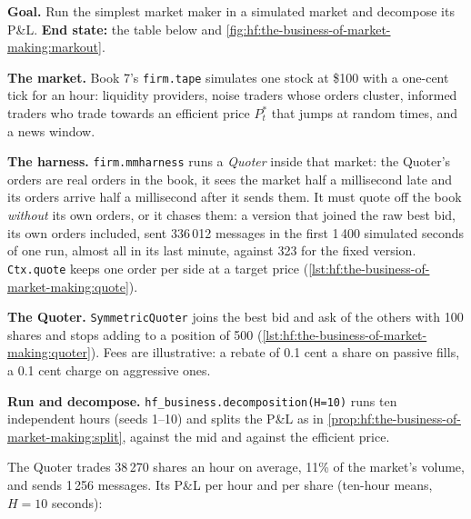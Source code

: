 \begin{tutorial}
\textbf{Goal.} Run the simplest market maker in a simulated market and decompose its P\&L. \textbf{End state:} the table below and
\cref{fig:hf:the-business-of-market-making:markout}.
\begin{tutsteps}
\item \textbf{The market.} Book 7's \texttt{firm.tape} simulates one stock at \$100 with a one-cent tick for an hour: liquidity providers, noise
traders whose orders cluster, informed traders who trade towards an efficient price $P^\ast_t$ that jumps at random times, and a news window.
\item \textbf{The harness.} \texttt{firm.mmharness} runs a \emph{Quoter} inside that market: the Quoter's orders are real orders in the book, it
sees the market half a millisecond late and its orders arrive half a millisecond after it sends them. It must quote off the book \emph{without}
its own orders, or it chases them: a version that joined the raw best bid, its own orders included, sent 336\,012 messages in the first
1\,400 simulated seconds of one run, almost all in its last minute, against 323 for the fixed version. \texttt{Ctx.quote} keeps one order per side at a target price
(\cref{lst:hf:the-business-of-market-making:quote}).
\label{lst:hf:the-business-of-market-making:quote}
\item \textbf{The Quoter.} \texttt{SymmetricQuoter} joins the best bid and ask of the others with 100 shares and stops adding to a position of
500 (\cref{lst:hf:the-business-of-market-making:quoter}). Fees are illustrative: a rebate of 0.1 cent a share on passive fills, a 0.1 cent charge
on aggressive ones.
\label{lst:hf:the-business-of-market-making:quoter}
\item \textbf{Run and decompose.} \texttt{hf\_business.decomposition(H=10)} runs ten independent hours (seeds 1--10) and splits the P\&L as in
\cref{prop:hf:the-business-of-market-making:split}, against the mid and against the efficient price.
\end{tutsteps}
\end{tutorial}

The Quoter trades 38\,270 shares an hour on average, 11\% of the market's volume, and sends 1\,256 messages. Its P\&L per hour and per share (ten-hour
means, $H=10$ seconds):

